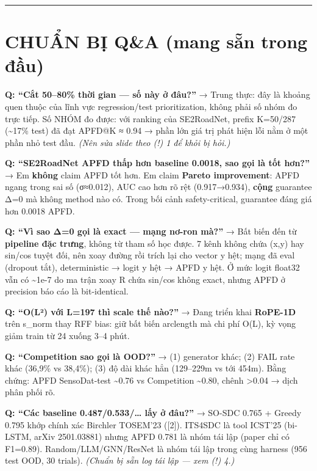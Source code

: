 \documentclass[
  11pt,
]{article}
\begin{document}
\begin{center}\rule{0.5\linewidth}{0.5pt}\end{center}

\section{CHUẨN BỊ Q\&A (mang sẵn trong
đầu)}\label{chuux1ea9n-bux1ecb-qa-mang-sux1eb5n-trong-ux111ux1ea7u}

\textbf{Q: ``Cắt 50--80\% thời gian --- số này ở đâu?''} → Trung thực:
đây là khoảng quen thuộc của lĩnh vực regression/test prioritization,
không phải số nhóm đo trực tiếp. Số NHÓM đo được: với ranking của
SE2RoadNet, prefix K=50/287 (\textasciitilde17\% test) đã đạt APFD@K ≈
0.94 → phần lớn giá trị phát hiện lỗi nằm ở một phần nhỏ test đầu.
\emph{(Nên sửa slide theo (!) 1 để khỏi bị hỏi.)}

\textbf{Q: ``SE2RoadNet APFD thấp hơn baseline 0.0018, sao gọi là tốt
hơn?''} → Em \textbf{không} claim APFD tốt hơn. Em claim \textbf{Pareto
improvement}: APFD ngang trong sai số (σ≈0.012), AUC cao hơn rõ rệt
(0.917→0.934), \textbf{cộng} guarantee Δ=0 mà không method nào có. Trong
bối cảnh safety-critical, guarantee đáng giá hơn 0.0018 APFD.

\textbf{Q: ``Vì sao Δ=0 gọi là exact --- mạng nơ-ron mà?''} → Bất biến
đến từ \textbf{pipeline đặc trưng}, không từ tham số học được. 7 kênh
không chứa (x,y) hay sin/cos tuyệt đối, nên xoay đường rồi trích lại cho
vector y hệt; mạng đã eval (dropout tắt), deterministic → logit y hệt →
APFD y hệt. Ở mức logit float32 vẫn có \textasciitilde1e-7 do ma trận
xoay R chứa sin/cos không exact, nhưng APFD ở precision báo cáo là
bit-identical.

\textbf{Q: ``O(L²) với L=197 thì scale thế nào?''} → Đang triển khai
\textbf{RoPE-1D} trên s\_norm thay RFF bias: giữ bất biến arclength mà
chi phí O(L), kỳ vọng giảm train từ 24 xuống 3--4 phút.

\textbf{Q: ``Competition sao gọi là OOD?''} → (1) generator khác; (2)
FAIL rate khác (36,9\% vs 38,4\%); (3) độ dài khác hẳn (129--229m vs tới
454m). Bằng chứng: APFD SensoDat-test \textasciitilde0.76 vs Competition
\textasciitilde0.80, chênh \textgreater0.04 → dịch phân phối rõ.

\textbf{Q: ``Các baseline 0.487/0.533/\ldots{} lấy ở đâu?''} → SO-SDC
0.765 + Greedy 0.795 khớp chính xác Birchler TOSEM'23 ({[}2{]}). ITS4SDC
là tool ICST'25 (bi-LSTM, arXiv 2501.03881) nhưng APFD 0.781 là nhóm tái
lập (paper chỉ có F1=0.89). Random/LLM/GNN/ResNet là nhóm tái lập trong
cùng harness (956 test OOD, 30 trials). \emph{(Chuẩn bị sẵn log tái lập
--- xem (!) 4.)}
\end{document}
